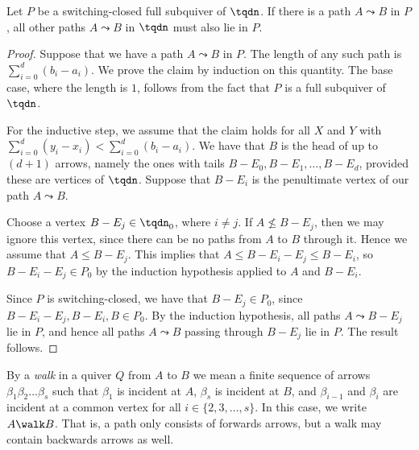 \begin{lemma}\label{lem:all_paths}
Let $P$ be a switching-closed full subquiver of $\tqdn$. If there is a path $A \leadsto B$ in $P$, all other paths $A \leadsto B$ in $\tqdn$ must also lie in $P$.
\end{lemma}
\begin{proof}
Suppose that we have a path $A \leadsto B$ in $P$. The length of any such path is $\sum_{i = 0}^{d}(b_{i} - a_{i})$. We prove the claim by induction on this quantity. The base case, where the length is $1$, follows from the fact that $P$ is a full subquiver of $\tqdn$.

For the inductive step, we assume that the claim holds for all $X$ and $Y$ with $\sum_{i = 0}^{d}(y_{i} - x_{i}) < \sum_{i = 0}^{d}(b_{i} - a_{i})$. We have that $B$ is the head of up to $(d + 1)$ arrows, namely the ones with tails $B - E_{0}, B - E_{1}, \dots, B - E_{d}$, provided these are vertices of $\tqdn$. Suppose that $B - E_{i}$ is the penultimate vertex of our path $A \leadsto B$.

Choose a vertex $B - E_{j} \in \tqdn_{0}$, where $i \neq j$. If $A \not\leqslant B - E_{j}$, then we may ignore this vertex, since there can be no paths from $A$ to $B$ through it. Hence we assume that $A \leqslant B - E_{j}$. This implies that $A \leqslant B - E_{i} - E_{j} \leqslant B - E_{i}$, so $B - E_{i} - E_{j} \in P_{0}$ by the induction hypothesis applied to $A$ and $B - E_{i}$.

Since $P$ is switching-closed, we have that $B - E_{j} \in P_{0}$, since $B - E_{i} - E_{j}, B - E_{i}, B \in P_{0}$. By the induction hypothesis, all paths $A \leadsto B - E_{j}$ lie in $P$, and hence all paths $A \leadsto B$ passing through $B - E_{j}$ lie in $P$. The result follows.
\end{proof}

By a \emph{walk} in a quiver $Q$ from $A$ to $B$ we mean a finite sequence of arrows $\beta_{1}\beta_{2}\dots\beta_{s}$ such that $\beta_{1}$ is incident at $A$, $\beta_{s}$ is incident at $B$, and $\beta_{i-1}$ and $\beta_{i}$ are incident at a common vertex for all $i \in \{2, 3, \dots, s\}$. In this case, we write $A \walk B$. That is, a path only consists of forwards arrows, but a walk may contain backwards arrows as well.

